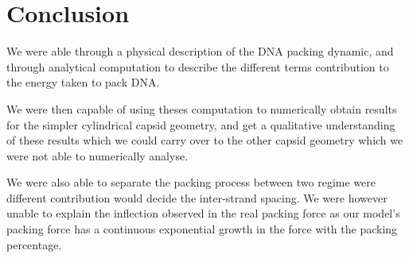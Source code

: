 \documentclass{article}
\begin{document}
\section{Conclusion}

We were able through a physical description of the DNA packing dynamic, and through analytical computation to describe the different terms contribution to the energy taken to pack DNA.

We were then capable of using theses computation to numerically obtain results for the simpler cylindrical capsid geometry, and get a qualitative understanding of these results which we could carry over to the other capsid geometry which we were not able to numerically analyse.

We were also able to separate the packing process between two regime were different contribution would decide the inter-strand spacing. We were however unable to explain the inflection observed in the real packing force as our model's packing force has a continuous exponential growth in the force with the packing percentage.





\end{document}

